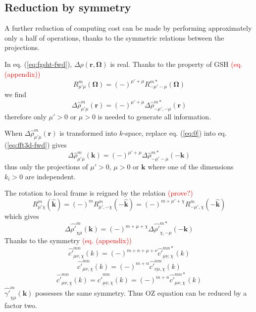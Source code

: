 \subsection{Reduction by symmetry\label{sub:Reduction-by-symmetry}}

A further reduction of computing cost can be made by performing approximately
only a half of operations, thanks to the symmetric relations between
the projections.

In eq. (\ref{eq:fgsht-fwd}), $\Delta\rho(\mathbf{r},\mathbf{\Omega})$
is real. Thanks to the property of GSH \textcolor{red}{(eq. (appendix))}
\[
R_{\mu'\mu}^{m}(\mathbf{\Omega})=(-)^{\mu'+\mu}R_{-\mu'-\mu}^{m*}(\mathbf{\Omega})
\]
we find
\begin{equation}
\Delta\hat{\rho}_{\mu'\mu}^{m}(\mathbf{r})=(-)^{\mu'+\mu}\Delta\hat{\rho}_{-\mu',-\mu}^{m*}(\mathbf{r})\label{eq:0}
\end{equation}
therefore only $\mu'>0$ or $\mu>0$ is needed to generate all information.

When $\Delta\hat{\rho}_{\mu'\mu}^{m}(\mathbf{r})$ is transformed
into $k$-space, replace eq. (\ref{eq:0}) into eq. (\ref{eq:fft3d-fwd})
gives
\begin{equation}
\Delta\hat{\rho}_{\mu'\mu}^{m}(\mathbf{k})=(-)^{\mu'+\mu}\Delta\hat{\rho}_{-\mu'-\mu}^{m*}(-\mathbf{k})\label{eq:1}
\end{equation}
thus only the projections of $\mu'>0$, $\mu>0$ or $\mathbf{k}$
where one of the dimensions $k_{i}>0$ are independent.

The rotation to local frame is reigned by the relation \textcolor{red}{(prove?)}
\begin{equation}
R_{\mu'\chi}^{m}(\hat{\mathbf{k}})=(-)^{m}R_{\mu',-\chi}^{m}(-\hat{\mathbf{k}})=(-)^{m+\mu'+\chi}R_{-\mu',\chi}^{m}(-\hat{\mathbf{k}})\label{eq:3}
\end{equation}
which gives
\begin{equation}
\Delta\hat{\rho'}_{\chi\mu}^{m}(\mathbf{k})=(-)^{m+\mu+\chi}\Delta\hat{\rho'}_{\chi,-\mu}^{m*}(-\mathbf{k})\label{eq:2}
\end{equation}
Thanks to the symmetry\textcolor{red}{{} (eq. (appendix))} 
\begin{equation}
\hat{c'}_{\mu\nu,\chi}^{mn}(k)=(-)^{m+n+\mu+\nu}\hat{c'}_{\underline{\mu}\underline{\nu},\chi}^{mn*}(k)
\end{equation}
\begin{equation}
\hat{c'}_{\mu\nu,\chi}^{mn}(k)=(-)^{m+n}\hat{c'}_{\nu\mu,\chi}^{nm}(k)
\end{equation}
\begin{equation}
\hat{c'}_{\mu\nu,\underline{\chi}}^{mn}(k)=\hat{c'}_{\underline{\mu}\underline{\nu},\chi}^{mn}(k)=(-)^{m+n}\hat{c'}_{\mu\nu,\chi}^{mn*}(k)
\end{equation}
$\hat{\gamma'}_{\chi\mu}^{m}(\mathbf{k})$ possesses the same symmetry.
Thus OZ equation can be reduced by a factor two.

